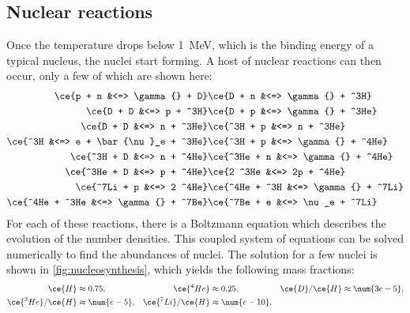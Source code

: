 \subsection{Nuclear reactions}
Once the temperature drops below \SI{1}{\MeV}, which is the binding energy of a typical nucleus, the nuclei start forming.
A host of nuclear reactions can then occur, only a few of which are shown here:
\begin{align*}
	\ce{p + n &<=> \gamma{} + D} &
	\ce{D + n &<=> \gamma{} + ^3H} \\
	\ce{D + D &<=> p + ^3H} &
	\ce{D + p &<=> \gamma{} + ^3He} \\
	\ce{D + D &<=> n + ^3He} &
	\ce{^3H + p &<=> n + ^3He} \\
	\ce{^3H &<=> e + \bar{\nu}_e + ^3He} &
	\ce{^3H + p &<=> \gamma{} + ^4He} \\
	\ce{^3H + D &<=> n + ^4He} & 
	\ce{^3He + n &<=> \gamma{} + ^4He} \\
	\ce{^3He + D &<=> p + ^4He} &
	\ce{2 ^3He &<=> 2p + ^4He} \\
	\ce{^7Li + p &<=> 2 ^4He} &
	\ce{^4He + ^3H &<=> \gamma{} + ^7Li} \\
	\ce{^4He + ^3He &<=> \gamma{} + ^7Be} &
	\ce{^7Be + e &<=> \nu_e + ^7Li}
\end{align*}
For each of these reactions, there is a Boltzmann equation which describes the evolution of the number densities.
This coupled system of equations can be solved numerically to find the abundances of nuclei.
The solution for a few nuclei is shown in \cref{fig:nucleosynthesis}, which yields the following mass fractions:
\begin{align*}
	\ce{H} &\approx 0.75,	& \ce{^4He} &\approx 0.25, 	&\ce{D}/\ce{H} \approx \num{3e-5},\\
	\ce{^3He}/\ce{H} &\approx \num{e-5},	&\ce{^7Li}/\ce{H} &\approx \num{e-10}.
\end{align*}


